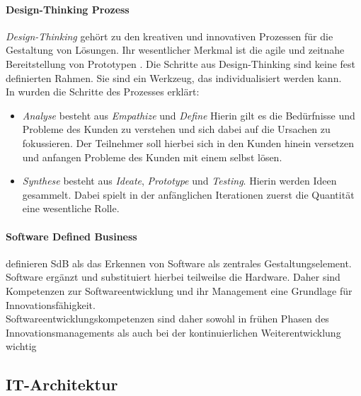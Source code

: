 \paragraph{Design-Thinking Prozess}
\label{def-design-thinking}
\emph{Design-Thinking} gehört zu den kreativen und innovativen Prozessen für die Gestaltung von Lösungen. Ihr wesentlicher Merkmal ist die agile und zeitnahe Bereitstellung von Prototypen \cite{Alt2017}. Die Schritte aus Design-Thinking sind keine fest definierten Rahmen. Sie sind ein Werkzeug, das individualisiert werden kann.
\medskip
\\
In \cite{yüksel:digit} wurden die Schritte des Prozesses erklärt: 
\begin{itemize}
    \item  \emph{Analyse} besteht aus \emph{Empathize} und \emph{Define} Hierin gilt es die Bedürfnisse und Probleme des Kunden zu verstehen und sich dabei auf die Ursachen zu fokussieren. Der Teilnehmer soll hierbei sich in den Kunden hinein versetzen und anfangen Probleme des Kunden mit einem selbst lösen. 
    \item \emph{Synthese} besteht aus \emph{Ideate}, \emph{Prototype} und \emph{Testing}. Hierin werden Ideen gesammelt. Dabei spielt in der anfänglichen Iterationen zuerst die Quantität eine wesentliche Rolle.
\end{itemize}

\paragraph{Software Defined Business}
\citet[S. 51]{Alt2017} definieren \ac{SdB} als das Erkennen von Software als zentrales Gestaltungselement. Software ergänzt und substituiert hierbei teilweilse die Hardware. Daher sind Kompetenzen zur Softwareentwicklung und ihr Management eine Grundlage für Innovationsfähigkeit.
\medskip
\\
Softwareentwicklungskompetenzen sind daher sowohl in frühen Phasen des Innovationsmanagements als auch bei der kontinuierlichen Weiterentwicklung wichtig \cite{Alt2017}
%
%
%

\subsection{IT-Architektur}

